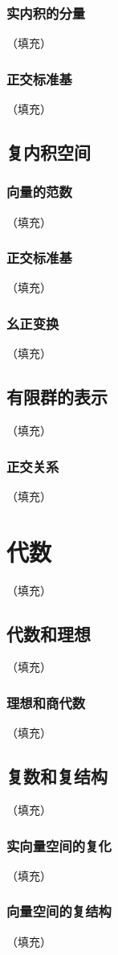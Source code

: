 \documentclass[hyperref,UTF8]{ctexbook}
\begin{document}
\subsection{实内积的分量}（填充）
\subsection{正交标准基}（填充）
\section{复内积空间}\label{sec:5.2}
\subsection{向量的范数}（填充）
\subsection{正交标准基}（填充）
\subsection{幺正变换}（填充）
\section{有限群的表示}（填充）
\subsection{正交关系}（填充）
\chapter{代数}（填充）
\section{代数和理想}（填充）
\subsection{理想和商代数}（填充）
\section{复数和复结构}（填充）
\subsection{实向量空间的复化}（填充）
\subsection{向量空间的复结构}（填充）
\end{document}
